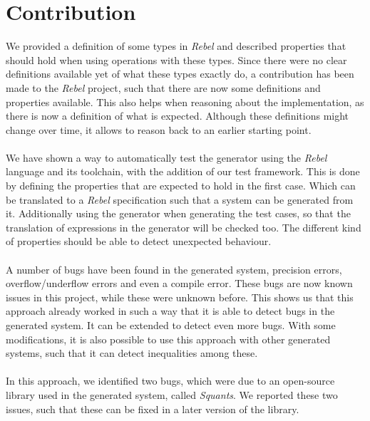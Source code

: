 \section{Contribution}
We provided a definition of some types in \textit{Rebel} and described properties that should hold when using operations with these types. Since there were no clear definitions available yet of what these types exactly do, a contribution has been made to the \textit{Rebel} project, such that there are now some definitions and properties available. This also helps when reasoning about the implementation, as there is now a definition of what is expected. Although these definitions might change over time, it allows to reason back to an earlier starting point.\\
\\
We have shown a way to automatically test the generator using the \textit{Rebel} language and its toolchain, with the addition of our test framework. This is done by defining the properties that are expected to hold in the first case. Which can be translated to a \textit{Rebel} specification such that a system can be generated from it. Additionally using the generator when generating the test cases, so that the translation of expressions in the generator will be checked too. The different kind of properties should be able to detect unexpected behaviour.\\
\\
A number of bugs have been found in the generated system, precision errors, overflow/underflow errors and even a compile error. These bugs are now known issues in this project, while these were unknown before. This shows us that this approach already worked in such a way that it is able to detect bugs in the generated system. It can be extended to detect even more bugs. With some modifications, it is also possible to use this approach with other generated systems, such that it can detect inequalities among these.\\
\\
In this approach, we identified two bugs, which were due to an open-source library used in the generated
system, called \textit{Squants}. We reported these two issues, such that these can be fixed in a later version of the library.

